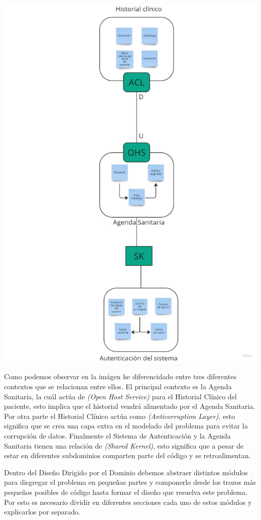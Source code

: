 \includegraphics{contextual_map.pdf}

Como podemos observar en la imágen he diferencidado entre tres diferentes contextos que se relacionan entre ellos. 
El principal contexto es la Agenda Sanitaria, la cuál actúa de \textit{(Open Host Service)} para el Historial Clínico del paciente, 
esto implica que el historial vendrá alimentado por el Agenda Sanitaria. Por otra parte el Historial Clínico actúa como 
\textit{(Anticorruption Layer)}, esto significa que se crea una capa extra en el modelado del problema para evitar la corrupción
de datos. Finalmente el Sistema de Autenticación y la Agenda Sanitaria tienen una relación de \textit{(Shared Kernel)}, esto significa
que a pesar de estar en diferentes subdominios comparten parte del código y se retroalimentan. 



Dentro del Diseño Dirigido por el Dominio debemos abstraer distintos módulos para disgregar el problema en pequeñas partes
y componerlo desde los trozos más pequeños posibles de código hasta formar el diseño que resuelva este problema. 
Por esto es necesario dividir en diferentes secciones cada uno de estos módulos y explicarlos por separado.

